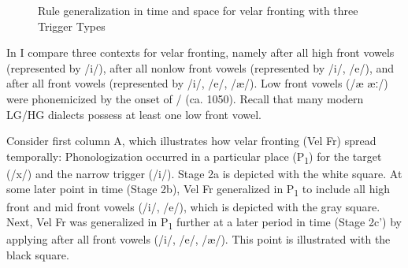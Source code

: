 \begin{figure}
\caption{Rule generalization in time and space for velar fronting with three Trigger Types\label{fig:16:1}}
\end{figure}

In  I compare three contexts for velar fronting, namely after all high front vowels (represented by /i/), after all nonlow front vowels (represented by /i/, /e/), and after all front vowels (represented by /i/, /e/, /æ/). Low front vowels (/æ æː/) were phonemicized by the onset of / (ca. 1050). Recall that many modern LG/HG dialects possess at least one low front vowel.

Consider first column A, which illustrates how velar fronting (Vel Fr) spread temporally: Phonologization occurred in a particular place (P\textsubscript{1}) for the target (/x/) and the narrow trigger (/i/). Stage 2a is depicted with the white square. At some later point in time (Stage 2b), Vel Fr generalized in P\textsubscript{1} to include all high front and mid front vowels (/i/, /e/), which is depicted with the gray square. Next, Vel Fr was generalized in P\textsubscript{1} further at a later period in time (Stage 2c') by applying after all front vowels (/i/, /e/, /æ/). This point is illustrated with the black square.

